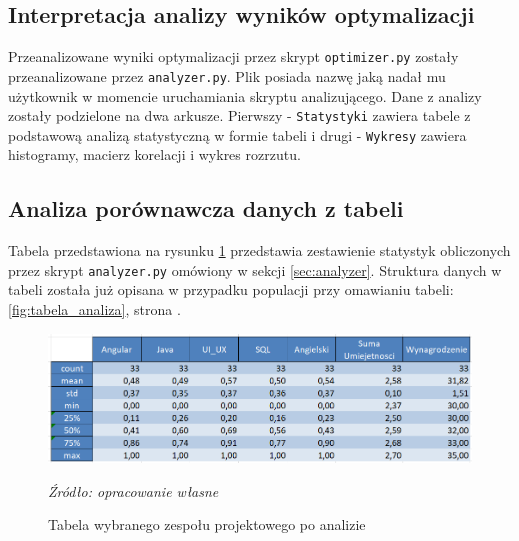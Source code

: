     \subsection{Interpretacja analizy wyników optymalizacji}\label{subsec:analiza_optimal}
    \par Przeanalizowane wyniki optymalizacji przez skrypt \verb|optimizer.py| zostały przeanalizowane przez \verb|analyzer.py|. Plik posiada nazwę jaką nadał mu użytkownik w momencie uruchamiania skryptu analizującego. Dane z analizy zostały podzielone na dwa arkusze. Pierwszy - \verb|Statystyki| zawiera tabele z podstawową analizą statystyczną w formie tabeli i drugi - \verb|Wykresy| zawiera histogramy, macierz korelacji i wykres rozrzutu.

    \subsection{Analiza porównawcza danych z tabeli}
    \par Tabela przedstawiona na rysunku \ref{fig:tabela_analiza_wybrani} przedstawia zestawienie statystyk obliczonych przez skrypt \verb|analyzer.py| omówiony w sekcji \ref{sec:analyzer}. Struktura danych w tabeli została już opisana w przypadku populacji przy omawianiu tabeli: \ref{fig:tabela_analiza}, strona \pageref{fig:tabela_analiza}.

    \begin{figure}[H]
        \centering
        \includegraphics[width=\linewidth]{chapters/Images/analiza_tabela_wybrani.png}
        \cprotect\caption{Tabela wybranego zespołu projektowego po analizie}
        \textit{Źródło: opracowanie własne} 
        \label{fig:tabela_analiza_wybrani}
    \end{figure}

